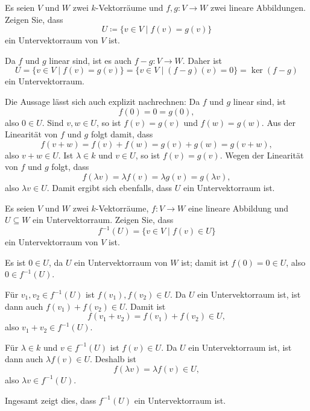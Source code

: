 \begin{question}
 Es seien $V$ und $W$ zwei $k$-Vektorräume und $f, g \colon V \to W$ zwei lineare Abbildungen. Zeigen Sie, dass 
 \[
  U \coloneqq \{v \in V \mid f(v) = g(v)\}
 \]
 ein Untervektorraum von $V$ ist.
\end{question}
\begin{solution}
 Da $f$ und $g$ linear sind, ist es auch $f-g \colon V \to W$. Daher ist
 \[
  U
  = \{v \in V \mid f(v) = g(v)\} 
  = \{v \in V \mid (f-g)(v) = 0\}
  = \ker (f-g)
 \]
 ein Untervektorraum.
 
 Die Aussage lässt sich auch explizit nachrechnen: Da $f$ und $g$ linear sind, ist
 \[
  f(0) = 0 = g(0),
 \]
 also $0 \in U$. Sind $v, w \in U$, so ist $f(v) = g(v)$ und $f(w) = g(w)$. Aus der Linearität von $f$ und $g$ folgt damit, dass
 \[
  f(v+w) = f(v) + f(w) = g(v) + g(w) = g(v+w),
 \]
 also $v+w \in U$. Ist $\lambda \in k$ und $v \in U$, so ist $f(v) = g(v)$. Wegen der Linearität von $f$ und $g$ folgt, dass
 \[
  f(\lambda v) = \lambda f(v) = \lambda g(v) = g(\lambda v),
 \]
 also $\lambda v \in U$. Damit ergibt sich ebenfalls, dass $U$ ein Untervektorraum ist.
\end{solution}


\begin{question}
 Es seien $V$ und $W$ zwei $k$-Vektorräume, $f \colon V \to W$ eine lineare Abbildung und $U \subseteq W$ ein Untervektorraum. Zeigen Sie, dass
 \[
  f^{-1}(U) = \{v \in V \mid f(v) \in U\}
 \]
 ein Untervektorraum von $V$ ist.
\end{question}
\begin{solution}
 Es ist $0 \in U$, da $U$ ein Untervektorraum von $W$ ist; damit ist $f(0) = 0 \in U$, also $0 \in f^{-1}(U)$.
 
 Für $v_1, v_2 \in f^{-1}(U)$ ist $f(v_1), f(v_2) \in U$. Da $U$ ein Untervektorraum ist, ist dann auch $f(v_1) + f(v_2) \in U$. Damit ist
 \[
  f(v_1 + v_2) = f(v_1) + f(v_2) \in U,
 \]
 also $v_1 + v_2 \in f^{-1}(U)$.
 
 Für $\lambda \in k$ und $v \in f^{-1}(U)$ ist $f(v) \in U$. Da $U$ ein Untervektorraum ist, ist dann auch $\lambda f(v) \in U$. Deshalb ist
 \[
  f(\lambda v) = \lambda f(v) \in U,
 \]
 also $\lambda v \in f^{-1}(U)$.
 
 Ingesamt zeigt dies, dass $f^{-1}(U)$ ein Untervektorraum ist.
\end{solution}


